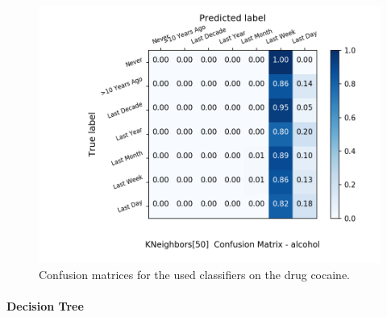 \documentclass{article}
\begin{document}
\begin{figure}[h!]
\begin{minipage}[b]{0.32\textwidth}
  \end{minipage}
	\begin{minipage}[b]{0.32\textwidth}
		\includegraphics[width=\textwidth]{Plots/alcohol_KNeighbors_50.png}
  \end{minipage}
	\caption{Confusion matrices for the used classifiers on the drug cocaine.}
	\label{fig:conf_matr_cocaine}
\end{figure}




\paragraph{Decision Tree}



\clearpage
{}

\end{document}
